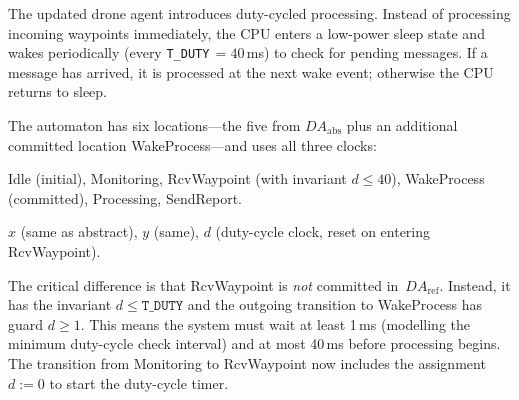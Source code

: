 \documentclass[11pt,a4paper]{article}
\newcommand{\DAabs}{\mathit{DA}_{\mathrm{abs}}}
\newcommand{\DAref}{\mathit{DA}_{\mathrm{ref}}}
\begin{document}
The updated drone agent introduces duty-cycled processing.  Instead of
processing incoming waypoints immediately, the CPU enters a low-power sleep
state and wakes periodically (every \texttt{T\_DUTY}\,$= 40$\,ms) to check
for pending messages.  If a message has arrived, it is processed at the next
wake event; otherwise the CPU returns to sleep.

The automaton has six locations---the five from $\DAabs$ plus an additional
committed location \textsf{WakeProcess}---and uses all three clocks:

\begin{description}[nosep,leftmargin=1.5em]
  \item[Locations:] \textsf{Idle} (initial), \textsf{Monitoring},
    \textsf{RcvWaypoint} (with invariant $d \leq 40$),
    \textsf{WakeProcess} (committed), \textsf{Processing},
    \textsf{SendReport}.
  \item[Clocks:] $x$ (same as abstract), $y$ (same), $d$ (duty-cycle clock,
    reset on entering \textsf{RcvWaypoint}).
\end{description}

\noindent
The critical difference is that \textsf{RcvWaypoint} is \emph{not} committed
in~$\DAref$.  Instead, it has the invariant $d \leq \texttt{T\_DUTY}$ and the
outgoing transition to \textsf{WakeProcess} has guard $d \geq 1$.  This means
the system must wait at least 1\,ms (modelling the minimum duty-cycle check
interval) and at most 40\,ms before processing begins.  The transition from
\textsf{Monitoring} to \textsf{RcvWaypoint} now includes the assignment
$d := 0$ to start the duty-cycle timer.
\end{document}
